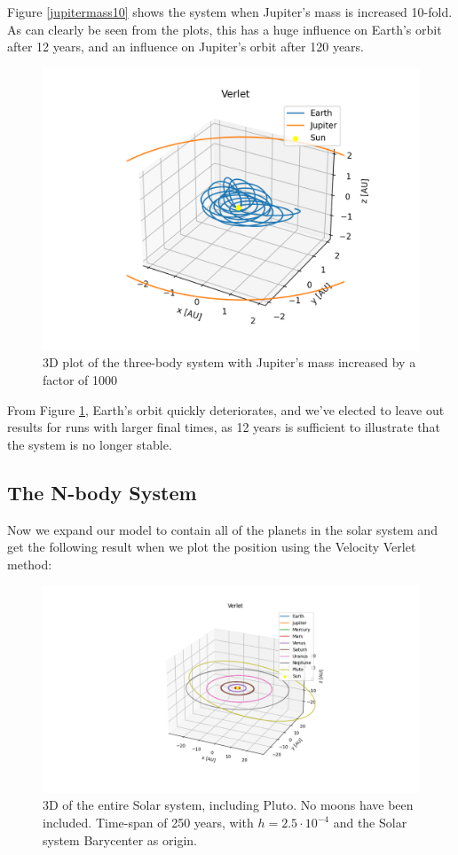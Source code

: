 	Figure \ref{jupitermass10} shows the system when Jupiter's mass is increased 10-fold. As can clearly be seen from the plots, this has a huge influence on Earth's orbit after 12 years, and an influence on Jupiter's orbit after 120 years.
	
	\begin{figure}[H]
    	\centering
    	\includegraphics[width=\textwidth]{Figure/threebody1000mass12.png}
    	\caption{3D plot of the three-body system with Jupiter's mass increased by a factor of 1000}
    	\label{jupitermass1000}
	\end{figure}
	
	From Figure \ref{jupitermass1000}, Earth's orbit quickly deteriorates, and we've elected to leave out results for runs with larger final times, as 12 years is sufficient to illustrate that the system is no longer stable. 
	
	\subsection{The N-body System}
	Now we expand our model to contain all of the planets in the solar system and get the following result when we plot the position using the Velocity Verlet method:
	
	\begin{figure}[H]
    	\centering
    	\includegraphics[width=\textwidth]{Figure/multibodyfixed250.png}
    	\caption{3D of the entire Solar system, including Pluto. No moons have been included. Time-span of 250 years, with $h=2.5\cdot10^{-4}$ and the Solar system Barycenter as origin.}
    	\label{nbody}
	\end{figure}
	
